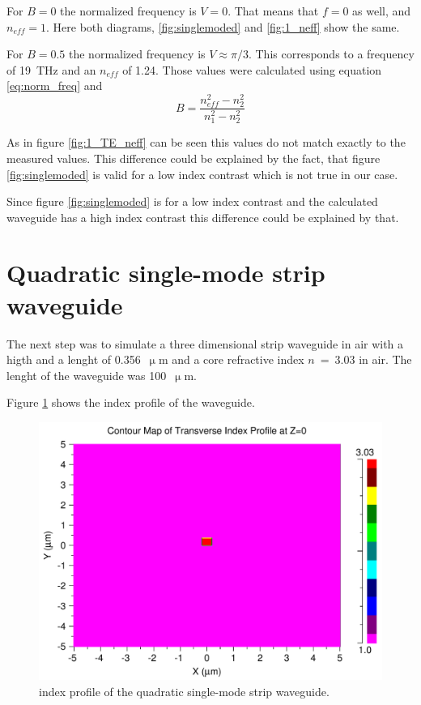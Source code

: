 For $B = 0$ the normalized frequency is $V = 0$. That means that $f = 0$ as well, and $n_{eff}= 1$. Here both diagrams, \ref{fig:singlemoded} and \ref{fig:1_neff} show the same.

For $B = 0.5$ the normalized frequency is $V\approx\pi/3$.
This corresponds to a frequency of 19~THz and an $n_{eff}$ of 1.24. 
Those values were calculated using equation \eqref{eq:norm_freq} and 
\begin{equation}
B = \frac{n_{eff}^2 - n_2^2}{n_1^2-n_2^2}
\label{eq:}
\end{equation}

As in figure \ref{fig:1_TE_neff} can be seen this values do not match exactly to the measured values.
This difference could be explained by the fact, that figure \ref{fig:singlemoded} is valid for a low index contrast which is not true in our case.


 Since figure \ref{fig:singlemoded} is for a low index contrast and the calculated waveguide has a high index contrast this difference could be explained by that. 


\section{Quadratic single-mode strip waveguide}
\label{sec:task2}

The next step was to simulate a three dimensional strip waveguide in air with a higth and a lenght of 0.356~$\upmu$m and a core refractive index $n$~=~3.03 in air.
The lenght of the waveguide was 100~$\upmu$m.

Figure \ref{fig:2_index} shows the index profile of the waveguide.
% 

\begin{figure}[h]%
\centering
\includegraphics[totalheight=5.5 cm]{Grafiken/2_index.pdf}%
\caption{index profile of the quadratic single-mode strip waveguide.}%
\label{fig:2_index}%
\end{figure}

